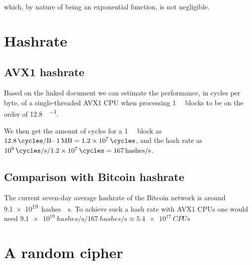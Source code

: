 \documentclass[a4paper]{scrreprt}
\begin{document}
which, by nature of being an exponential function, is not negligible.

\section{Hashrate}

\subsection{AVX1 hashrate}

Based on the linked document we can estimate the performance, in cycles per
byte, of a single-threaded AVX1 CPU when processing \SI{1}{\mega\byte} blocks to be on
the order of \SI{12.8}{\cycles \per \byte}.

We then get the amount of cycles for a \SI{1}{\mega\byte} block as
$\SI{12.8}{\cycles \per \byte} \cdot \SI{1}{\mega\byte} = \SI{1.2e7}{\cycles}$,
and the hash rate as $\SI{e9}{\cycles \per \second} / \SI{1.2e7}{\cycles} =
\SI{167}{hashes \per \second}$.

\subsection{Comparison with Bitcoin hashrate}

The current seven-day average hashrate of the Bitcoin network is around
\SI{9.1e19}{hashes \per \second}. To achieve such a hash rate with AVX1 CPUs
one would need $\SI{9.1e19}{hashes \per \second} / \SI{167}{hashes \per
\second} \approx \SI{5.4e17}{CPUs}$

\section{A random cipher}
\end{document}
